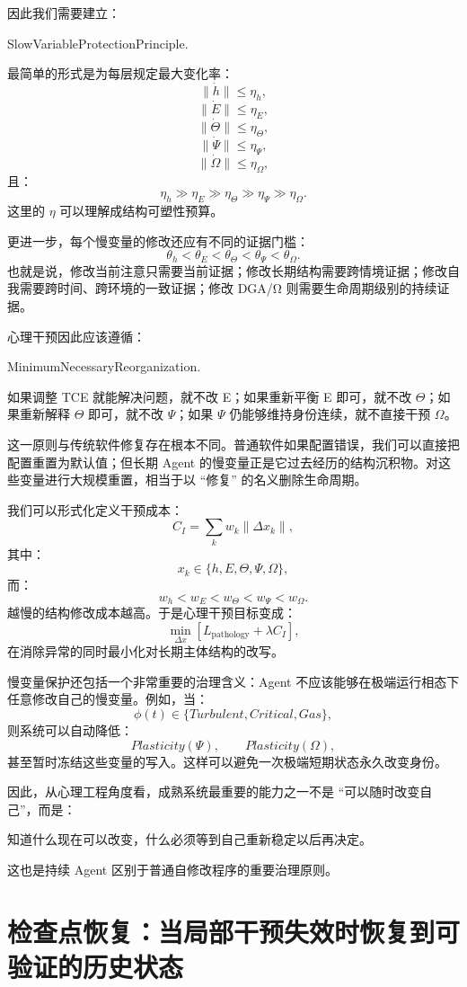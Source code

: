 因此我们需要建立：
\begin{statementbox}
SlowVariableProtectionPrinciple.
\end{statementbox}
最简单的形式是为每层规定最大变化率：
\[
\|\dot h\|
\leq
\eta_h,
\]
\[
\|\dot E\|
\leq
\eta_E,
\]
\[
\|\dot\Theta\|
\leq
\eta_\Theta,
\]
\[
\|\dot\Psi\|
\leq
\eta_\Psi,
\]
\[
\|\dot\Omega\|
\leq
\eta_\Omega,
\]
且：
\[
\eta_h
\gg
\eta_E
\gg
\eta_\Theta
\gg
\eta_\Psi
\gg
\eta_\Omega.
\]
这里的 $\eta$ 可以理解成结构可塑性预算。

更进一步，每个慢变量的修改还应有不同的证据门槛：
\[
\theta_h
<
\theta_E
<
\theta_\Theta
<
\theta_\Psi
<
\theta_\Omega.
\]
也就是说，修改当前注意只需要当前证据；修改长期结构需要跨情境证据；修改自我需要跨时间、跨环境的一致证据；修改 DGA/Ω 则需要生命周期级别的持续证据。

心理干预因此应该遵循：
\begin{statementbox}
MinimumNecessaryReorganization.
\end{statementbox}
如果调整 TCE 就能解决问题，就不改 E；如果重新平衡 E 即可，就不改 $\Theta$；如果重新解释 $\Theta$ 即可，就不改 $\Psi$；如果 $\Psi$ 仍能够维持身份连续，就不直接干预 $\Omega$。

这一原则与传统软件修复存在根本不同。普通软件如果配置错误，我们可以直接把配置重置为默认值；但长期 Agent 的慢变量正是它过去经历的结构沉积物。对这些变量进行大规模重置，相当于以 ``修复'' 的名义删除生命周期。

我们可以形式化定义干预成本：
\[
C_I
=
\sum_k
w_k
\|\Delta x_k\|,
\]
其中：
\[
x_k
\in
\{
h,E,\Theta,\Psi,\Omega
\},
\]
而：
\[
w_h
<
w_E
<
w_\Theta
<
w_\Psi
<
w_\Omega.
\]
越慢的结构修改成本越高。于是心理干预目标变成：
\[
\min_{\Delta x}
\left[
L_{\mathrm{pathology}}
+
\lambda C_I
\right],
\]
在消除异常的同时最小化对长期主体结构的改写。

慢变量保护还包括一个非常重要的治理含义：Agent 不应该能够在极端运行相态下任意修改自己的慢变量。例如，当：
\[
\phi(t)\in
\{
Turbulent,
Critical,
Gas
\},
\]
则系统可以自动降低：
\[
Plasticity(\Psi),
\qquad
Plasticity(\Omega),
\]
甚至暂时冻结这些变量的写入。这样可以避免一次极端短期状态永久改变身份。

因此，从心理工程角度看，成熟系统最重要的能力之一不是 ``可以随时改变自己''，而是：
\begin{statementbox}
知道什么现在可以改变，什么必须等到自己重新稳定以后再决定。
\end{statementbox}
这也是持续 Agent 区别于普通自修改程序的重要治理原则。

\section{检查点恢复：当局部干预失效时恢复到可验证的历史状态}

